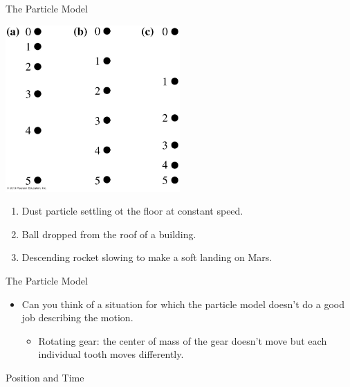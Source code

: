 \documentclass{beamer}
\begin{document}
\begin{frame}{The Particle Model}
\begin{center}
   \includegraphics[width=0.5\textwidth]{../figures/Figure_STT1_2.jpg}
   \begin{enumerate}
      \item Dust particle settling ot the floor at constant speed.
      \item Ball dropped from the roof of a building.
      \item Descending rocket slowing to make a soft landing on Mars.
   \end{enumerate}
\end{center}
\end{frame}

\begin{frame}{The Particle Model}
\begin{itemize}
   \item Can you think of a situation for which the particle model doesn't do a good job describing the motion.
   \begin{itemize}
      \item<2> Rotating gear: the center of mass of the gear doesn't move but each individual tooth moves differently.
   \end{itemize}
\end{itemize}
\end{frame}

\begin{frame}{Position and Time}
\begin{center}
\end{center}
\end{frame}
\end{document}
